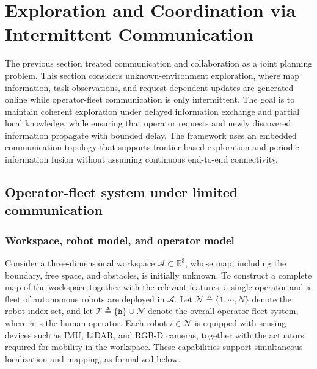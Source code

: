 \section{Exploration and Coordination via Intermittent Communication}
\label{ch05:sec:intermittent_comm}

The previous section treated communication and collaboration as a joint planning
problem. This section considers unknown-environment exploration, where map
information, task observations, and request-dependent updates are generated
online while operator-fleet communication is only intermittent. The goal is to
maintain coherent exploration under delayed information exchange and partial
local knowledge, while ensuring that operator requests and newly discovered
information propagate with bounded delay. The framework uses an embedded
communication topology that supports frontier-based exploration and periodic
information fusion without assuming continuous end-to-end connectivity.



\subsection{Operator-fleet system under limited communication}
\label{ch05:sec:problem-exploration}


\subsubsection{Workspace, robot model, and operator model}
\label{ch05:subsec:ws}

Consider a three-dimensional workspace
$\mathcal{A} \subset \mathbb{R}^3$, whose map, including the boundary, free
space, and obstacles, is initially unknown. To construct a complete map of the
workspace together with the relevant features, a single operator and a fleet of
autonomous robots are deployed in $\mathcal{A}$. Let
$\mathcal{N} \triangleq \{1,\cdots,N\}$ denote the robot index set, and let
$\mathcal{T} \triangleq \{\texttt{h}\} \cup \mathcal{N}$ denote the overall
operator-fleet system, where $\texttt{h}$ is the human operator. Each robot
$i \in \mathcal{N}$ is equipped with sensing devices such as IMU, LiDAR, and
RGB-D cameras, together with the actuators required for mobility in the
workspace. These capabilities support simultaneous localization and mapping, as
formalized below.

